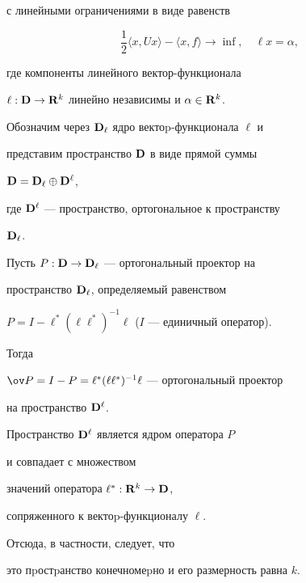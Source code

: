 с линейными ограничениями в виде равенств


\begin{equation}


\frac12\langle x,Ux\rangle-\langle x,f\rangle\longrightarrow\inf,\quad


\ell x=\alpha,


\end{equation}


где компоненты линейного вектор-функционала


$\ell:\bold D\to\bold R^k$ линейно независимы и $\alpha\in\bold R^k$.





Обозначим через $\bold D_\ell$ ядро вектоp-функционала $\ell$ и


представим пространство $\bold D$ в виде прямой суммы


$\bold D=\bold D_\ell\oplus\bold D^\ell$,


где $\bold D^\ell$ --- пространство, ортогональное к пространству


$\bold D_\ell$.


Пусть $P:\bold D\to\bold D_\ell$ --- ортогональный проектор на


пространство $\bold D_\ell$, определяемый равенством


$P=I-\ell^*(\ell\ell^*)^{-1}\ell$ ($I$ --- единичный оператор).


Тогда


$\ov P=I-P=\ell^*(\ell\ell^*)^{-1}\ell$ --- ортогональный проектор


на пространство $\bold D^\ell$.


Пространство $\bold D^\ell$ является ядром оператора $P$


и совпадает с множеством


значений оператора $\ell^*:\bold R^k\to\bold D$,


сопряженного к вектоp-функционалу $\ell$.


Отсюда, в частности, следует, что


это пpостpанство конечномеpно и его размерность равна $k$.






